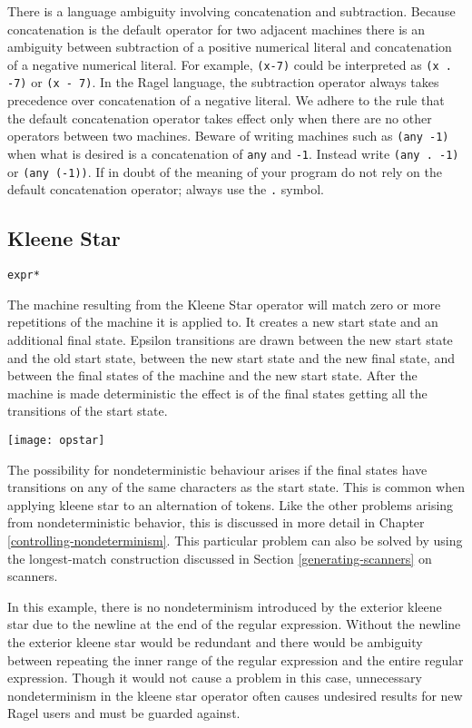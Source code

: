 \documentclass[letterpaper,11pt,oneside]{book}
\newcommand{\verbspace}{\vspace{10pt}}
\newcommand{\graphspace}{\vspace{10pt}}
\begin{document}
 There is a language
ambiguity involving concatenation and subtraction. Because concatenation is the 
default operator for two
adjacent machines there is an ambiguity between subtraction of
a positive numerical literal and concatenation of a negative numerical literal.
For example, \verb|(x-7)| could be interpreted as \verb|(x . -7)| or 
\verb|(x - 7)|. In the Ragel language, the subtraction operator always takes precedence
over concatenation of a negative literal. We adhere to the rule that the default
concatenation operator takes effect only when there are no other operators between
two machines. Beware of writing machines such as \verb|(any -1)| when what is
desired is a concatenation of \verb|any| and \verb|-1|. Instead write 
\verb|(any . -1)| or \verb|(any (-1))|. If in doubt of the meaning of your program do not
rely on the default concatenation operator; always use the \verb|.| symbol.


\subsection{Kleene Star}

\verb|expr*|
\verbspace

The machine resulting from the Kleene Star operator will match zero or more
repetitions of the machine it is applied to.
It creates a new start state and an additional final
state.  Epsilon transitions are drawn between the new start state and the old start
state, between the new start state and the new final state, and
between the final states of the machine and the new start state.  After the
machine is made deterministic the effect is of the final states getting all the
transitions of the start state. 

\graphspace
\begin{center}
\texttt{[image: opstar]}
\end{center}
\graphspace

The possibility for nondeterministic behaviour arises if the final states have
transitions on any of the same characters as the start state.  This is common
when applying kleene star to an alternation of tokens. Like the other problems
arising from nondeterministic behavior, this is discussed in more detail in Chapter
\ref{controlling-nondeterminism}. This particular problem can also be solved
by using the longest-match construction discussed in Section 
\ref{generating-scanners} on scanners.

In this 
example, there is no nondeterminism introduced by the exterior kleene star due to
the newline at the end of the regular expression. Without the newline the
exterior kleene star would be redundant and there would be ambiguity between
repeating the inner range of the regular expression and the entire regular
expression. Though it would not cause a problem in this case, unnecessary
nondeterminism in the kleene star operator often causes undesired results for
new Ragel users and must be guarded against.
\end{document}
